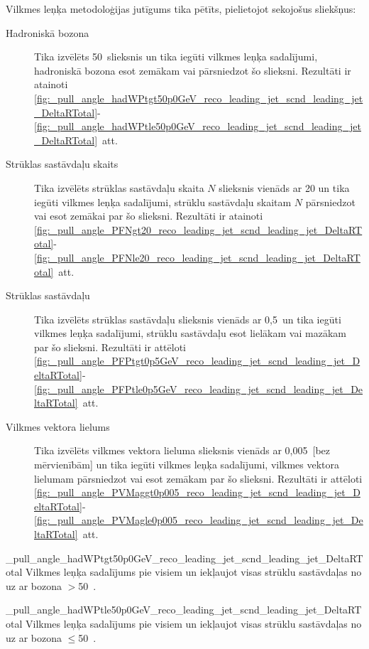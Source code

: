 Vilkmes leņķa metodoloģijas jutīgums tika pētīts, pielietojot sekojošus \gls{sliekšņus}:
\begin{description}
\item[Hadroniskā \PW bozona \pt] Tika izvēlēts 50~\GeV slieksnis un tika iegūti vilkmes leņķa sadalījumi, hadroniskā \PW bozona \pt esot zemākam vai pārsniedzot šo slieksni. Rezultāti ir atainoti \ref{fig:_pull_angle_hadWPtgt50p0GeV_reco_leading_jet_scnd_leading_jet_DeltaRTotal}-\ref{fig:_pull_angle_hadWPtle50p0GeV_reco_leading_jet_scnd_leading_jet_DeltaRTotal}~att.

\item[Strūklas sastāvdaļu skaits] Tika izvēlēts strūklas sastāvdaļu skaita $N$ slieksnis vienāds ar 20 un tika iegūti vilkmes leņķa sadalījumi, strūklu sastāvdaļu skaitam $N$ pārsniedzot vai esot zemākai par šo slieksni. Rezultāti ir atainoti \ref{fig:_pull_angle_PFNgt20_reco_leading_jet_scnd_leading_jet_DeltaRTotal}-\ref{fig:_pull_angle_PFNle20_reco_leading_jet_scnd_leading_jet_DeltaRTotal}~att.
                                        
\item[Strūklas sastāvdaļu \pt] Tika izvēlēts strūklas sastāvdaļu \pt slieksnis vienāds ar 0,5~\GeV un tika iegūti vilkmes leņķa sadalījumi, strūklu sastāvdaļu \pt esot lielākam vai mazākam par šo slieksni. Rezultāti ir attēloti \ref{fig:_pull_angle_PFPtgt0p5GeV_reco_leading_jet_scnd_leading_jet_DeltaRTotal}-\ref{fig:_pull_angle_PFPtle0p5GeV_reco_leading_jet_scnd_leading_jet_DeltaRTotal}~att.

\item[Vilkmes vektora lielums] Tika izvēlēts vilkmes vektora lieluma slieksnis vienāds ar 0,005~[bez mērvienībām] un tika iegūti vilkmes leņķa sadalījumi, vilkmes vektora lielumam pārsniedzot vai esot zemākam par šo slieksni. Rezultāti ir attēloti \ref{fig:_pull_angle_PVMaggt0p005_reco_leading_jet_scnd_leading_jet_DeltaRTotal}-\ref{fig:_pull_angle_PVMagle0p005_reco_leading_jet_scnd_leading_jet_DeltaRTotal}~att.
\end{description}

          {_pull_angle_hadWPtgt50p0GeV_reco_leading_jet_scnd_leading_jet_DeltaRTotal}
          {Vilkmes leņķa sadalījums pie visiem \DeltaR un iekļaujot visas strūklu sastāvdaļas no \leadingjet uz \scndleadingjet ar \PW bozona \pt$>$50~\GeV.}

          {_pull_angle_hadWPtle50p0GeV_reco_leading_jet_scnd_leading_jet_DeltaRTotal}
          {Vilkmes leņķa sadalījums pie visiem \DeltaR un iekļaujot visas strūklu sastāvdaļas no \leadingjet uz \scndleadingjet ar \PW bozona \pt$\leq$50~\GeV.}
          


